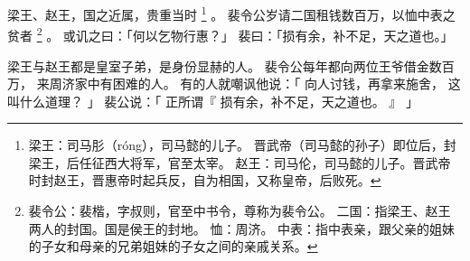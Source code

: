 
\switchcolumn*[\section{}]

梁王、赵王，国之近属，贵重当时%
\footnote{%
    梁王：司马肜（róng），司马懿的儿子。
          晋武帝（司马懿的孙子）即位后，封梁王，后任征西大将军，官至太宰。
    赵王：司马伦，司马懿的儿子。晋武帝时封赵王，晋惠帝时起兵反，自为相国，又称皇帝，后败死。
}%
。
裴令公岁请二国租钱数百万，以恤中表之贫者%
\footnote{%
    裴令公：裴楷，字叔则，官至中书令，尊称为裴令公。
    二国：指梁王、赵王两人的封国。国是侯王的封地。
    恤：周济。
    中表：指中表亲，跟父亲的姐妹的子女和母亲的兄弟姐妹的子女之间的亲戚关系。
}%
。
或讥之曰：「何以乞物行惠？」
裴曰：「损有余，补不足，天之道也。」

\switchcolumn

梁王与赵王都是皇室子弟，是身份显赫的人。
裴令公每年都向两位王爷借金数百万，
来周济家中有困难的人。
有的人就嘲讽他说：「
    向人讨钱，再拿来施舍，
    这叫什么道理？
」
裴公说：「
    正所谓『
        损有余，补不足，天之道也。
    』
」

